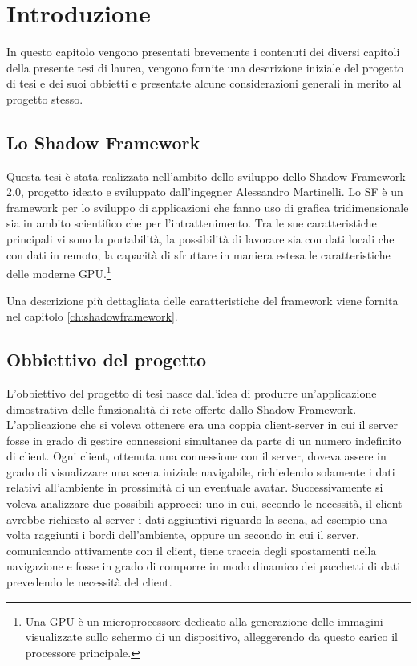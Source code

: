 
\chapter{Introduzione}
\label{ch:introduzione}
In questo capitolo vengono presentati brevemente i contenuti dei diversi capitoli della presente tesi di laurea, vengono fornite una descrizione iniziale del progetto di tesi e dei suoi obbietti e presentate alcune considerazioni generali in merito al progetto stesso.

\section{Lo Shadow Framework}
\label{sec:sfintro}
Questa tesi è stata realizzata nell'ambito dello sviluppo dello Shadow Framework 2.0, progetto ideato e sviluppato dall'ingegner Alessandro Martinelli.
Lo \ac{SF} è un framework per lo sviluppo di applicazioni che fanno uso di grafica tridimensionale sia in ambito scientifico che per l'intrattenimento.
Tra le sue caratteristiche principali vi sono la portabilità, la possibilità di lavorare sia con dati locali che con dati in remoto, la capacità di sfruttare in maniera estesa le caratteristiche delle moderne \ac{GPU}.\footnote{Una \ac{GPU} è un microprocessore dedicato alla generazione delle immagini visualizzate sullo schermo di un dispositivo, alleggerendo da questo carico il processore principale.}

Una descrizione più dettagliata delle caratteristiche del framework viene fornita nel capitolo \ref{ch:shadowframework}.

%
%
\section{Obbiettivo del progetto}
\label{sec:obbiettivo}
L'obbiettivo del progetto di tesi nasce dall'idea di produrre un'applicazione dimostrativa delle funzionalità di rete offerte dallo Shadow Framework.
L'applicazione che si voleva ottenere era una coppia client-server in cui il server fosse in grado di gestire connessioni simultanee da parte di un numero indefinito di client. 
Ogni client, ottenuta una connessione con il server, doveva assere in grado di visualizzare una scena iniziale navigabile, richiedendo solamente i dati relativi all'ambiente in prossimità di un eventuale avatar.
Successivamente si voleva analizzare due possibili approcci: uno in cui, secondo le necessità, il client avrebbe richiesto al server i dati aggiuntivi riguardo la scena, ad esempio una volta raggiunti i bordi dell'ambiente, oppure un secondo in cui il server, comunicando attivamente con il client, tiene traccia degli spostamenti nella navigazione e fosse in grado di comporre in modo dinamico dei pacchetti di dati prevedendo le necessità del client.


